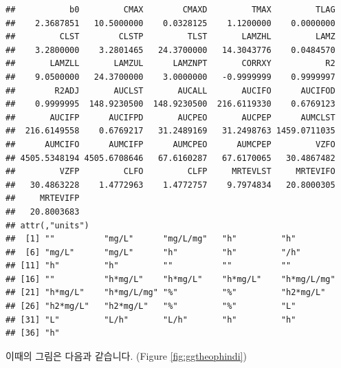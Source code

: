\documentclass[9pt,]{krantz}
\newenvironment{Shaded}{\begin{snugshade}}{\end{snugshade}}
\newcommand{\KeywordTok}[1]{\textcolor[rgb]{0.13,0.29,0.53}{\textbf{#1}}}
\newcommand{\DataTypeTok}[1]{\textcolor[rgb]{0.13,0.29,0.53}{#1}}
\newcommand{\DecValTok}[1]{\textcolor[rgb]{0.00,0.00,0.81}{#1}}
\newcommand{\StringTok}[1]{\textcolor[rgb]{0.31,0.60,0.02}{#1}}
\newcommand{\CommentTok}[1]{\textcolor[rgb]{0.56,0.35,0.01}{\textit{#1}}}
\newcommand{\OperatorTok}[1]{\textcolor[rgb]{0.81,0.36,0.00}{\textbf{#1}}}
\newcommand{\NormalTok}[1]{#1}
\begin{document}
\begin{Shaded}
\end{Shaded}

\begin{verbatim}
##           b0         CMAX        CMAXD         TMAX         TLAG 
##    2.3687851   10.5000000    0.0328125    1.1200000    0.0000000 
##         CLST        CLSTP         TLST       LAMZHL         LAMZ 
##    3.2800000    3.2801465   24.3700000   14.3043776    0.0484570 
##       LAMZLL       LAMZUL      LAMZNPT       CORRXY           R2 
##    9.0500000   24.3700000    3.0000000   -0.9999999    0.9999997 
##        R2ADJ       AUCLST       AUCALL       AUCIFO      AUCIFOD 
##    0.9999995  148.9230500  148.9230500  216.6119330    0.6769123 
##       AUCIFP      AUCIFPD       AUCPEO       AUCPEP      AUMCLST 
##  216.6149558    0.6769217   31.2489169   31.2498763 1459.0711035 
##      AUMCIFO      AUMCIFP      AUMCPEO      AUMCPEP         VZFO 
## 4505.5348194 4505.6708646   67.6160287   67.6170065   30.4867482 
##         VZFP         CLFO         CLFP     MRTEVLST     MRTEVIFO 
##   30.4863228    1.4772963    1.4772757    9.7974834   20.8000305 
##     MRTEVIFP 
##   20.8003683 
## attr(,"units")
##  [1] ""          "mg/L"      "mg/L/mg"   "h"         "h"        
##  [6] "mg/L"      "mg/L"      "h"         "h"         "/h"       
## [11] "h"         "h"         ""          ""          ""         
## [16] ""          "h*mg/L"    "h*mg/L"    "h*mg/L"    "h*mg/L/mg"
## [21] "h*mg/L"    "h*mg/L/mg" "%"         "%"         "h2*mg/L"  
## [26] "h2*mg/L"   "h2*mg/L"   "%"         "%"         "L"        
## [31] "L"         "L/h"       "L/h"       "h"         "h"        
## [36] "h"
\end{verbatim}

이때의 그림은 다음과 같습니다. (Figure \ref{fig:ggtheophindi})
\end{document}
